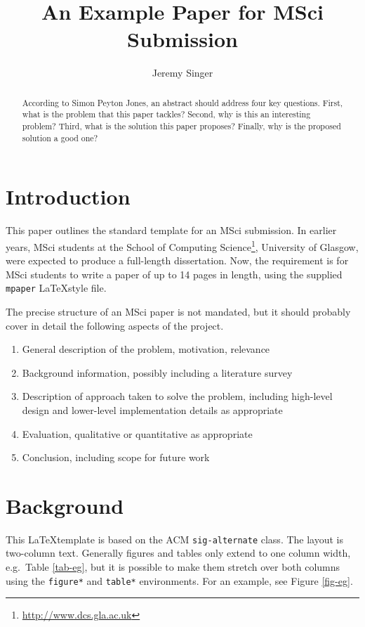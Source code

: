 \documentclass{mpaper}
\begin{document}
\title{An Example Paper for MSci Submission}
\author{Jeremy Singer}

\maketitle

\begin{abstract}
According to Simon Peyton Jones, an abstract should address
four key questions. First, what is the problem that this
paper tackles? Second, why is this an interesting problem?
Third, what is the solution this paper proposes?
Finally, why is the proposed solution a good one?
\end{abstract}

\section{Introduction}

This paper outlines the standard template for an MSci submission.
In earlier years, MSci students at the School of Computing
Science\footnote{\url{http://www.dcs.gla.ac.uk}},
University of Glasgow, were expected to produce a full-length
dissertation. Now, the requirement is for MSci students to
write a paper of up to 14 pages in length, using the supplied
\texttt{mpaper} \LaTeX style file.

The precise structure of an MSci paper is not mandated, but it should
probably cover in detail the following aspects of the project.
\begin{enumerate}
\item General description of the problem, motivation, relevance
\item Background information, possibly including a literature survey
\item Description of approach taken to solve the problem, including
  high-level design and lower-level implementation details as appropriate
\item Evaluation, qualitative or quantitative as appropriate
\item Conclusion, including scope for future work
\end{enumerate}

\section{Background}

This \LaTeX template is based on the ACM \texttt{sig-alternate} class.
The layout is two-column text. Generally figures and tables only
extend to one column width, e.g.\ Table \ref{tab-eg},
but it is possible to make them
stretch over both columns using the \texttt{figure*} and
\texttt{table*} environments. For an example, see Figure \ref{fig-eg}.
\end{document}

